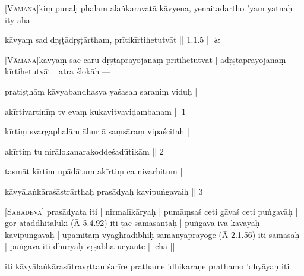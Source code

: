 \documentclass[14pt]{extarticle}
\begin{document}
\pstart
 \textsc{[Vāmana]}kiṃ punaḥ phalam alaṅkaravatā kāvyena, yenaitadartho ’yam yatnaḥ ity āha— 
\pend


\stanza[\smallskip]

 \large kāvyaṃ sad dṛṣṭādṛṣṭārtham, prītikīrtihetutvāt || 1.1.5 || \&



\pstart
 \textsc{[Vāmana]}kāvyaṃ sac cāru dṛṣṭaprayojanaṃ prītihetutvāt | adṛṣṭaprayojanaṃ kīrtihetutvāt | atra ślokāḥ — 


pratiṣṭhāṃ kāvyabandhasya yaśasaḥ saraṇiṃ viduḥ | 

akīrtivartinīṃ tv evaṃ kukavitvaviḍambanam || 1 

kīrtiṃ svargaphalām āhur ā saṃsāraṃ vipaścitaḥ | 

akīrtiṃ tu nirālokanarakoddeśadūtikām || 2 

tasmāt kīrtim upādātum akīrtiṃ ca nivarhitum | 

\smallskip
kāvyālaṅkāraśāstrārthaḥ prasādyaḥ kavipuṅgavaiḥ || 3 \\

\pend


\pstart

             \textsc{[Sahadeva]} prasādyata iti | nirmalīkāryaḥ | pumāṃsaś ceti gāvaś ceti puṅgavāḥ | gor ataddhitaluki (Ā 5.4.92) iti ṭac samāsantaḥ | puṅgavā iva kavayaḥ kavipuṅgavāḥ | upamitaṃ vyāghrādibhiḥ sāmānyāprayoge (Ā 2.1.56) iti samāsaḥ | puṅgavā iti dhuryāḥ vṛṣabhā ucyante || cha || 
\pend


\pstart
 iti kāvyālaṅkārasūtravṛttau śarīre prathame ’dhikaraṇe prathamo ’dhyāyaḥ iti 
\pend



\endnumbering
\endgroup
\end{document}
